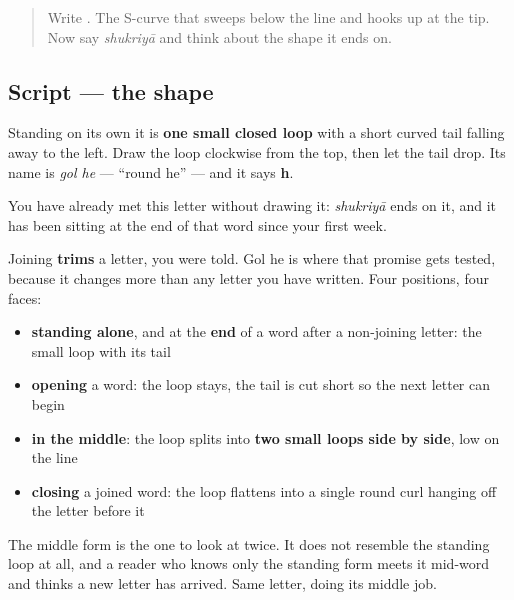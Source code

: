 \label{lesson:UR-W05-he}



\begin{quote}
Write . The S-curve that sweeps below the line and hooks up at the tip. Now say \emph{shukriyā} and think about the shape it ends on.
\end{quote}

\subsection*{Script — the shape}

\begin{quote}
\end{quote}

Standing on its own it is \textbf{one small closed loop} with a short curved tail falling away to the left. Draw the loop clockwise from the top, then let the tail drop. Its name is \textbf{} \emph{gol he} — \textquotedblleft{}round he\textquotedblright{} — and it says \textbf{h}.

You have already met this letter without drawing it: \textbf{} \emph{shukriyā} ends on it, and it has been sitting at the end of that word since your first week.

Joining \textbf{trims} a letter, you were told. Gol he is where that promise gets tested, because it changes more than any letter you have written. Four positions, four faces:

\begin{itemize}
\raggedright
  \item \textbf{standing alone}, and at the \textbf{end} of a word after a non-joining letter: the small loop with its tail
  \item \textbf{opening} a word: the loop stays, the tail is cut short so the next letter can begin
  \item \textbf{in the middle}: the loop splits into \textbf{two small loops side by side}, low on the line
  \item \textbf{closing} a joined word: the loop flattens into a single round curl hanging off the letter before it
\end{itemize}

The middle form is the one to look at twice. It does not resemble the standing loop at all, and a reader who knows only the standing form meets it mid-word and thinks a new letter has arrived. Same letter, doing its middle job.

